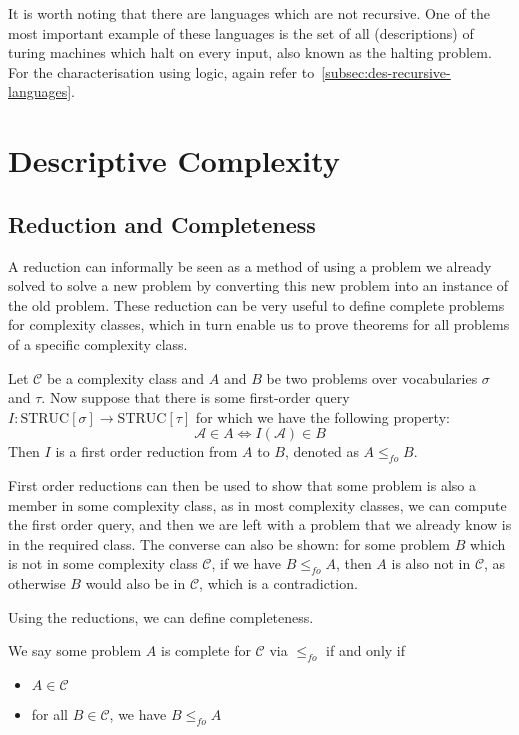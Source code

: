 It is worth noting that there are languages which are not recursive.
One of the most important example of these languages is the set of all (descriptions) of turing machines which halt on every input, also known as the halting problem.
For the characterisation using logic, again refer to~\cref{subsec:des-recursive-languages}.

\section{Descriptive Complexity}\label{sec:descriptive-complexity-context}

\subsection{Reduction and Completeness}\label{subsec:reduction}

A reduction can informally be seen as a method of using a problem we already solved to solve a new problem by converting this new problem into an instance of the old problem.
These reduction can be very useful to define complete problems for complexity classes, which in turn enable us to prove theorems for all problems of a specific complexity class.

\begin{define}
    Let $\mathcal{C}$ be a complexity class and $A$ and $B$ be two problems over vocabularies $\sigma$ and $\tau$.
    Now suppose that there is some first-order query $I: \text{STRUC}[\sigma] \to \text{STRUC}[\tau]$ for which we have the following property:
    \[
        \mathcal{A} \in A \Leftrightarrow I(\mathcal{A}) \in B
    \]
    Then $I$ is a first order reduction from $A$ to $B$, denoted as $A \leq_{fo} B$.
\end{define}

First order reductions can then be used to show that some problem is also a member in some complexity class, as in most complexity classes, we can compute the first order query, and then we are left with a problem that we already know is in the required class.
The converse can also be shown: for some problem $B$ which is not in some complexity class $\mathcal{C}$, if we have $B \leq_{fo} A$, then $A$ is also not in $\mathcal{C}$, as otherwise $B$ would also be in $\mathcal{C}$, which is a contradiction.

Using the reductions, we can define completeness.

\begin{define}
    We say some problem $A$ is complete for $\mathcal{C}$ via $\leq_{fo}$ if and only if
    \begin{itemize}
        \setlength\itemsep{0.2em}
        \item $A \in \mathcal{C}$
        \item for all $B \in \mathcal{C}$, we have $B \leq_{fo} A$
    \end{itemize}
\end{define}

